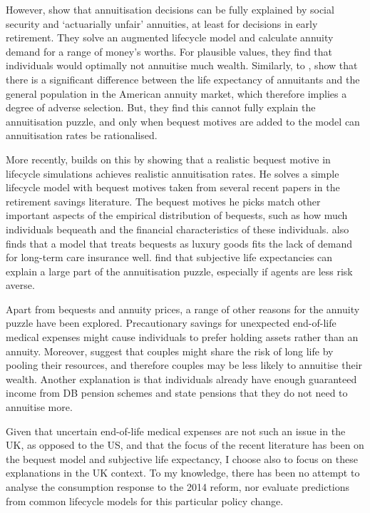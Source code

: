\documentclass[12pt]{article}
\begin{document}
However, \cite{friedman_warshawsky_qje_1990} show that annuitisation decisions
can be fully explained by social security and `actuarially unfair' annuities, at
least for decisions in early retirement. They solve an augmented lifecycle model
and calculate annuity demand for a range of money's worths. For plausible values,
they find that individuals would optimally not annuitise much wealth. Similarly,
to \cite{finkelstein_porteba_2004}, \cite{friedman_warshawsky_chicago_1988} show
that there is a significant difference between the life expectancy of annuitants
and the general population in the American annuity market, which therefore
implies a degree of adverse selection. But, they find this cannot fully explain
the annuitisation puzzle, and only when bequest motives are added to the model
can annuitisation rates be rationalised.

More recently, \cite{lockwood_red_2012} builds on this by showing that a
realistic bequest motive in lifecycle simulations achieves realistic
annuitisation rates. He solves a simple lifecycle model with bequest motives
taken from several recent papers in the retirement savings literature. The
bequest motives he picks match other important aspects of the empirical
distribution of bequests, such as how much individuals bequeath and the
financial characteristics of these individuals. \cite{lockwood_aer_2018} also
finds that a model that treats bequests as luxury goods fits the lack of demand
for long-term care insurance well. \cite{odea_sturrock_rest_2023} find that
subjective life expectancies can explain a large part of the annuitisation
puzzle, especially if agents are less risk averse.

Apart from bequests and annuity prices, a range of other reasons for the annuity
puzzle have been explored. Precautionary savings for unexpected end-of-life
medical expenses might cause individuals to prefer holding assets rather than
an annuity. Moreover, \cite{vidalmelia_lejarragagarcia_munich_2004} suggest
that couples might share the risk of long life by pooling their resources, and
therefore couples may be less likely to annuitise their wealth. Another
explanation is that individuals already have enough guaranteed income from DB
pension schemes and state pensions that they do not need to annuitise more.

Given that uncertain end-of-life medical expenses are not such an issue in the
UK, as opposed to the US, and that the focus of the recent literature has been
on the bequest model and subjective life expectancy, I choose also to focus on
these explanations in the UK context. To my knowledge, there has been no attempt
to analyse the consumption response to the 2014 reform, nor evaluate predictions
from common lifecycle models for this particular policy change.
\end{document}
